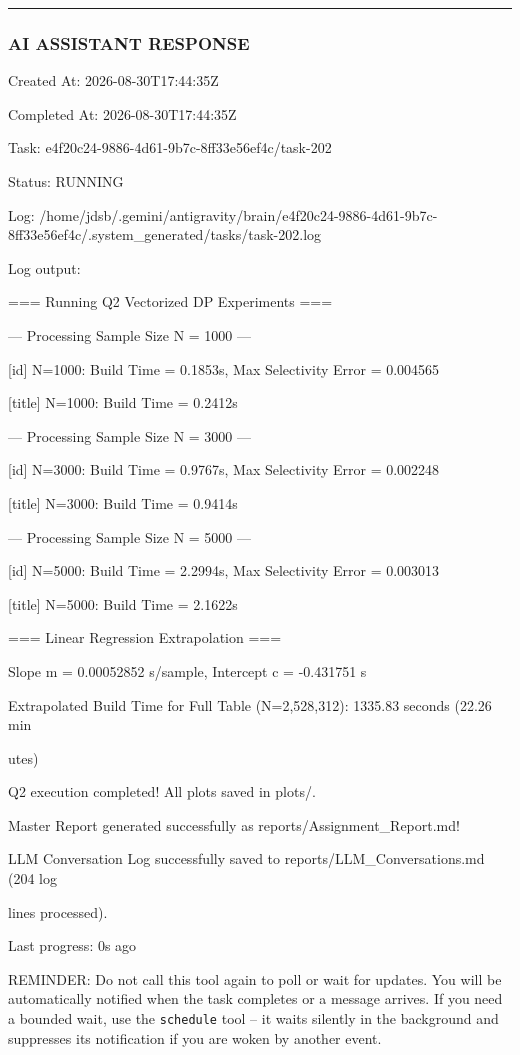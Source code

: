 \documentclass[11pt,a4paper]{article}
\begin{document}
{\hrule

\subsubsection{AI ASSISTANT RESPONSE}

Created At: 2026-08-30T17:44:35Z

Completed At: 2026-08-30T17:44:35Z

Task: e4f20c24-9886-4d61-9b7c-8ff33e56ef4c/task-202

Status: RUNNING

Log: /home/jdsb/.gemini/antigravity/brain/e4f20c24-9886-4d61-9b7c-8ff33e56ef4c/.system\_generated/tasks/task-202.log

Log output:

=== Running Q2 Vectorized DP Experiments ===


--- Processing Sample Size N = 1000 ---

[id] N=1000: Build Time = 0.1853s, Max Selectivity Error = 0.004565

[title] N=1000: Build Time = 0.2412s


--- Processing Sample Size N = 3000 ---

[id] N=3000: Build Time = 0.9767s, Max Selectivity Error = 0.002248

[title] N=3000: Build Time = 0.9414s


--- Processing Sample Size N = 5000 ---

[id] N=5000: Build Time = 2.2994s, Max Selectivity Error = 0.003013

[title] N=5000: Build Time = 2.1622s

=== Linear Regression Extrapolation ===

Slope m = 0.00052852 s/sample, Intercept c = -0.431751 s

Extrapolated Build Time for Full Table (N=2,528,312): 1335.83 seconds (22.26 min

utes)

Q2 execution completed! All plots saved in plots/.

Master Report generated successfully as reports/Assignment\_Report.md!

LLM Conversation Log successfully saved to reports/LLM\_Conversations.md (204 log

lines processed).


Last progress: 0s ago



REMINDER: Do not call this tool again to poll or wait for updates. You will be automatically notified when the task completes or a message arrives. If you need a bounded wait, use the \texttt{schedule} tool -- it waits silently in the background and suppresses its notification if you are woken by another event.


}
\end{document}
